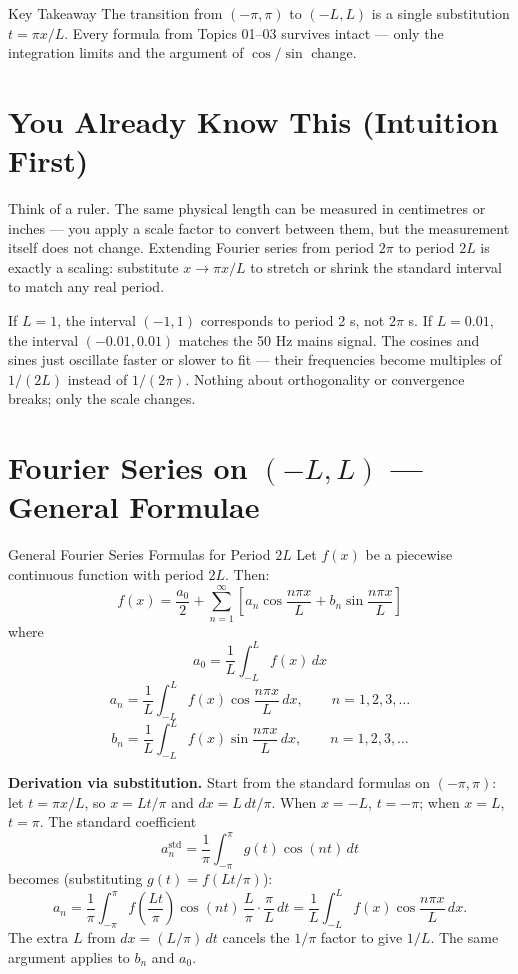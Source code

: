 \documentclass[12pt,a4paper]{article}
\begin{document}
\begin{learnbox}{Key Takeaway}
The transition from $(-\pi,\pi)$ to $(-L,L)$ is a single substitution $t = \pi x / L$.
Every formula from Topics 01--03 survives intact --- only the integration limits and the argument of $\cos/\sin$ change.
\end{learnbox}

\section{You Already Know This (Intuition First)}

Think of a ruler.
The same physical length can be measured in centimetres or inches --- you apply a scale factor to convert between them, but the measurement itself does not change.
Extending Fourier series from period $2\pi$ to period $2L$ is exactly a scaling: substitute $x \to \pi x / L$ to stretch or shrink the standard interval to match any real period.

If $L = 1$, the interval $(-1, 1)$ corresponds to period 2 s, not $2\pi$ s.
If $L = 0.01$, the interval $(-0.01, 0.01)$ matches the 50 Hz mains signal.
The cosines and sines just oscillate faster or slower to fit --- their frequencies become multiples of $1/(2L)$ instead of $1/(2\pi)$.
Nothing about orthogonality or convergence breaks; only the scale changes.

\section{Fourier Series on $(-L, L)$ --- General Formulae}

\begin{infobox}{General Fourier Series Formulas for Period $2L$}
Let $f(x)$ be a piecewise continuous function with period $2L$.
Then:
\[
f(x) = \frac{a_0}{2} + \sum_{n=1}^{\infty}\left[a_n\cos\frac{n\pi x}{L} + b_n\sin\frac{n\pi x}{L}\right]
\]
where
\[
a_0 = \frac{1}{L}\int_{-L}^{L}f(x)\,dx
\]
\[
a_n = \frac{1}{L}\int_{-L}^{L}f(x)\cos\frac{n\pi x}{L}\,dx, \qquad n = 1,2,3,\ldots
\]
\[
b_n = \frac{1}{L}\int_{-L}^{L}f(x)\sin\frac{n\pi x}{L}\,dx, \qquad n = 1,2,3,\ldots
\]

\medskip
\noindent\textbf{Derivation via substitution.}
Start from the standard formulas on $(-\pi, \pi)$: let $t = \pi x / L$, so $x = Lt/\pi$ and $dx = L\,dt/\pi$.
When $x = -L$, $t = -\pi$; when $x = L$, $t = \pi$.
The standard coefficient
\[
a_n^{\text{std}} = \frac{1}{\pi}\int_{-\pi}^{\pi} g(t)\cos(nt)\,dt
\]
becomes (substituting $g(t) = f(Lt/\pi)$):
\[
a_n = \frac{1}{\pi}\int_{-\pi}^{\pi} f\!\left(\frac{Lt}{\pi}\right)\cos(nt)\,\frac{L}{\pi}\cdot\frac{\pi}{L}\,dt
 = \frac{1}{L}\int_{-L}^{L} f(x)\cos\frac{n\pi x}{L}\,dx.
\]
The extra $L$ from $dx = (L/\pi)\,dt$ cancels the $1/\pi$ factor to give $1/L$.
The same argument applies to $b_n$ and $a_0$.
\end{infobox}
\end{document}
